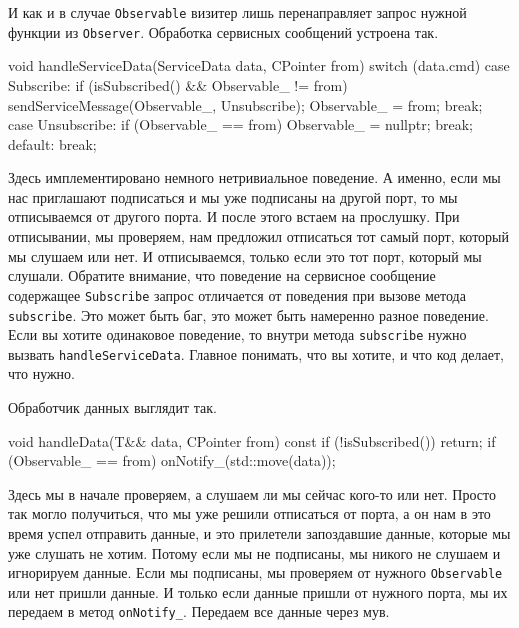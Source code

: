 И как и в случае \verb"Observable" визитер лишь перенаправляет запрос нужной функции из \verb"Observer".
Обработка сервисных сообщений устроена так.
\begin{cppcode}
void handleServiceData(ServiceData data, CPointer from) {
  switch (data.cmd) {
  case Subscribe:
    if (isSubscribed() && Observable_ != from)
      sendServiceMessage(Observable_, {Unsubscribe});
    Observable_ = from;
    break;
  case Unsubscribe:
    if (Observable_ == from)
      Observable_ = nullptr;
    break;
  default:
    break;
  }
}
\end{cppcode}
Здесь имплементировано немного нетривиальное поведение.
А именно, если мы нас приглашают подписаться и мы уже подписаны на другой порт, то мы отписываемся от другого порта.
И после этого встаем на прослушку.
При отписывании, мы проверяем, нам предложил отписаться тот самый порт, который мы слушаем или нет.
И отписываемся, только если это тот порт, который мы слушали.
Обратите внимание, что поведение на сервисное сообщение содержащее \verb"Subscribe" запрос отличается от поведения при вызове метода \verb"subscribe".
Это может быть баг, это может быть намеренно разное поведение.
Если вы хотите одинаковое поведение, то внутри метода \verb"subscribe" нужно вызвать \verb"handleServiceData".
Главное понимать, что вы хотите, и что код делает, что нужно.

Обработчик данных выглядит так.
\begin{cppcode}
void handleData(T&& data, CPointer from) const {
  if (!isSubscribed())
    return;
  if (Observable_ == from)
    onNotify_(std::move(data));
}
\end{cppcode}
Здесь мы в начале проверяем, а слушаем ли мы сейчас кого-то или нет.
Просто так могло получиться, что мы уже решили отписаться от порта, а он нам в это время успел отправить данные, и это прилетели запоздавшие данные, которые мы уже слушать не хотим.
Потому если мы не подписаны, мы никого не слушаем и игнорируем данные.
Если мы подписаны, мы проверяем от нужного \verb"Observable" или нет пришли данные.
И только если данные пришли от нужного порта, мы их передаем в метод \verb"onNotify_".
Передаем все данные через мув.
